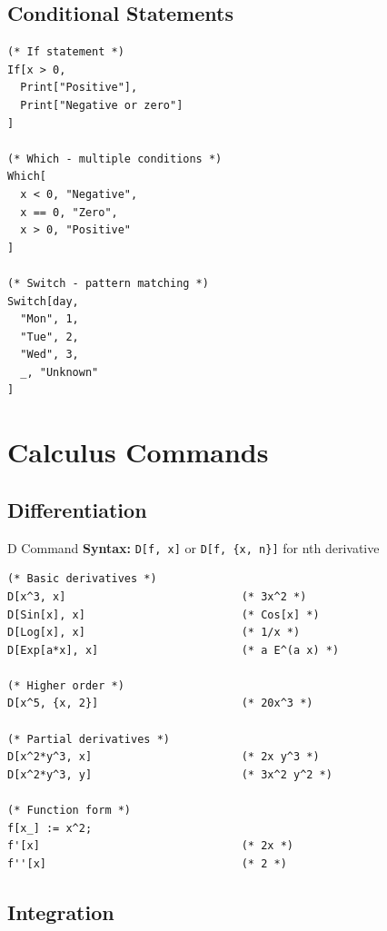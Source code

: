 \documentclass[12pt,a4paper]{article}
\begin{document}
\subsection{Conditional Statements}

\begin{commandbox}
\begin{lstlisting}
(* If statement *)
If[x > 0,
  Print["Positive"],
  Print["Negative or zero"]
]

(* Which - multiple conditions *)
Which[
  x < 0, "Negative",
  x == 0, "Zero",
  x > 0, "Positive"
]

(* Switch - pattern matching *)
Switch[day,
  "Mon", 1,
  "Tue", 2,
  "Wed", 3,
  _, "Unknown"
]
\end{lstlisting}
\end{commandbox}

\section{Calculus Commands}

\subsection{Differentiation}

\begin{mainbox}{D Command}
\textbf{Syntax:} \texttt{D[f, x]} or \texttt{D[f, \{x, n\}]} for nth derivative

\begin{lstlisting}
(* Basic derivatives *)
D[x^3, x]                           (* 3x^2 *)
D[Sin[x], x]                        (* Cos[x] *)
D[Log[x], x]                        (* 1/x *)
D[Exp[a*x], x]                      (* a E^(a x) *)

(* Higher order *)
D[x^5, {x, 2}]                      (* 20x^3 *)

(* Partial derivatives *)
D[x^2*y^3, x]                       (* 2x y^3 *)
D[x^2*y^3, y]                       (* 3x^2 y^2 *)

(* Function form *)
f[x_] := x^2;
f'[x]                               (* 2x *)
f''[x]                              (* 2 *)
\end{lstlisting}
\end{mainbox}

\subsection{Integration}
\end{document}
